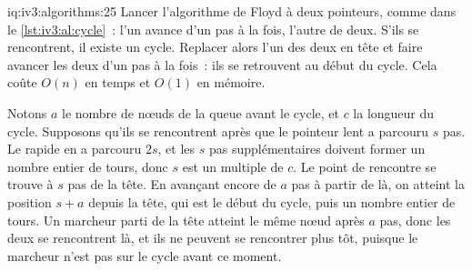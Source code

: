 \begin{solution}{iq:iv3:algorithms:25}
Lancer l'algorithme de Floyd à deux pointeurs, comme dans le \cref{lst:iv3:al:cycle}~: l'un avance d'un pas à la fois, l'autre de deux. S'ils se rencontrent, il existe un cycle. Replacer alors l'un des deux en tête et faire avancer les deux d'un pas à la fois~: ils se retrouvent au début du cycle. Cela coûte $O(n)$ en temps et $O(1)$ en mémoire.
\label{lst:iv3:al:cycle}

Notons $a$ le nombre de nœuds de la queue avant le cycle, et $c$ la longueur du cycle. Supposons qu'ils se rencontrent après que le pointeur lent a parcouru $s$ pas. Le rapide en a parcouru $2s$, et les $s$ pas supplémentaires doivent former un nombre entier de tours, donc $s$ est un multiple de $c$. Le point de rencontre se trouve à $s$ pas de la tête. En avançant encore de $a$ pas à partir de là, on atteint la position $s + a$ depuis la tête, qui est le début du cycle, puis un nombre entier de tours. Un marcheur parti de la tête atteint le même nœud après $a$ pas, donc les deux se rencontrent là, et ils ne peuvent se rencontrer plus tôt, puisque le marcheur n'est pas sur le cycle avant ce moment.

\end{solution}

